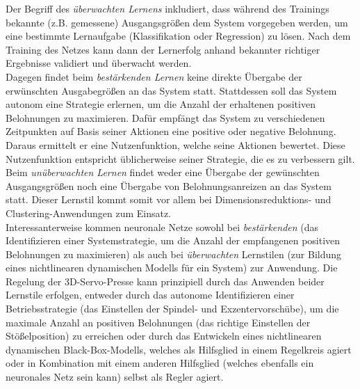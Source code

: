 Der Begriff des \textit{überwachten Lernens} inkludiert, dass während des Trainings bekannte (z.B. gemessene) Ausgangsgrößen dem System vorgegeben werden, um eine bestimmte Lernaufgabe (Klassifikation oder Regression) zu lösen. Nach dem Training des Netzes kann dann der Lernerfolg anhand bekannter richtiger Ergebnisse validiert und überwacht  werden. \\
Dagegen findet beim \textit{bestärkenden Lernen} keine direkte Übergabe der erwünschten Ausgabegrößen an das System statt. Stattdessen soll das System autonom eine Strategie erlernen, um die Anzahl der erhaltenen positiven Belohnungen zu maximieren. Dafür empfängt das System zu verschiedenen Zeitpunkten auf Basis seiner Aktionen eine positive oder negative Belohnung. Daraus ermittelt er eine Nutzenfunktion, welche seine Aktionen bewertet. Diese Nutzenfunktion entspricht üblicherweise seiner Strategie, die es zu verbessern gilt. \\
Beim \textit{unüberwachten Lernen} findet weder eine Übergabe der gewünschten Ausgangsgrößen noch eine Übergabe von Belohnungsanreizen an das System statt. Dieser Lernstil kommt somit vor allem bei Dimensionsreduktions- und Clustering-Anwendungen zum Einsatz. \\

Interessanterweise kommen neuronale Netze sowohl bei \textit{bestärkenden} (das Identifizieren einer Systemstrategie, um die Anzahl der empfangenen positiven Belohnungen zu maximieren) als auch bei \textit{überwachten} Lernstilen (zur Bildung eines nichtlinearen dynamischen Modells für ein System) zur Anwendung. Die Regelung der 3D-Servo-Presse kann prinzipiell durch das Anwenden beider Lernstile erfolgen, entweder durch das autonome Identifizieren einer Betriebsstrategie (das Einstellen der Spindel- und Exzentervorschübe), um die maximale Anzahl an positiven Belohnungen (das richtige Einstellen der Stößelposition) zu erreichen oder durch das Entwickeln eines nichtlinearen dynamischen Black-Box-Modells, welches als Hilfsglied in einem Regelkreis agiert oder in Kombination mit einem anderen Hilfsglied (welches ebenfalls ein neuronales Netz sein kann) selbst als Regler agiert.



 







